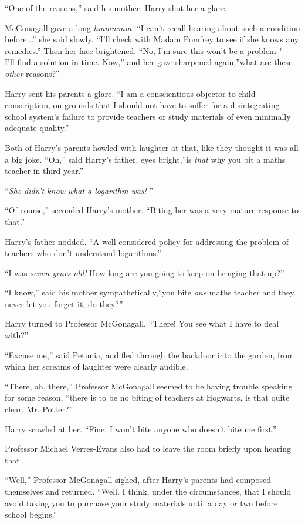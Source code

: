 ``One of the reasons,'' said his mother. Harry shot her a glare.

McGonagall gave a long \emph{hmmmmm.} ``I can't recall hearing about
such a condition before...'' she said slowly. ``I'll check with
Madam Pomfrey to see if she knows any remedies.'' Then her face
brightened. ``No, I'm sure this won't be a problem "--- I'll find a
solution in time. Now,'' and her gaze sharpened again,''what are these
\emph{other} reasons?''

Harry sent his parents a glare. ``I am a conscientious objector to child
conscription, on grounds that I should not have to suffer for a
disintegrating school system's failure to provide teachers or study
materials of even minimally adequate quality.''

Both of Harry's parents howled with laughter at that, like they thought
it was all a big joke. ``Oh,'' said Harry's father, eyes bright,''is
\emph{that} why you bit a maths teacher in third year.''

``\emph{She didn't know what a logarithm was!} ''

``Of course,'' seconded Harry's mother. ``Biting her was a very mature
response to that.''

Harry's father nodded. ``A well-considered policy for addressing the
problem of teachers who don't understand logarithms.''

``I was \emph{seven years old!} How long are you going to keep on
bringing that up?''

``I know,'' said his mother sympathetically,''you bite \emph{one} maths
teacher and they never let you forget it, do they?''

Harry turned to Professor McGonagall. ``There! You see what I have to
deal with?''

``Excuse me,'' said Petunia, and fled through the backdoor into the
garden, from which her screams of laughter were clearly audible.

``There, ah, there,'' Professor McGonagall seemed to be having trouble
speaking for some reason, ``there is to be no biting of teachers at
Hogwarts, is that quite clear, Mr. Potter?''

Harry scowled at her. ``Fine, I won't bite anyone who doesn't bite me
first.''

Professor Michael Verres-Evans also had to leave the room briefly upon
hearing that.

``Well,'' Professor McGonagall sighed, after Harry's parents had
composed themselves and returned. ``Well. I think, under the
circumstances, that I should avoid taking you to purchase your study
materials until a day or two before school begins.''


